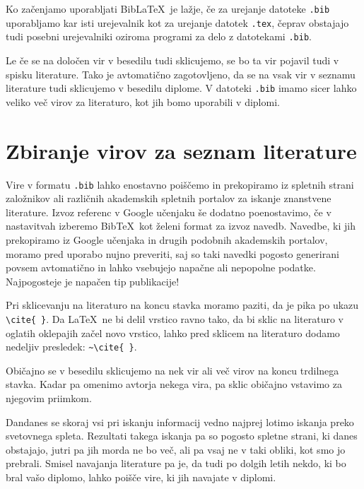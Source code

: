\documentclass[a4paper,12pt,openright]{book}
\newcommand{\BibLaTeX}{{\sc Bib}\LaTeX}
\newcommand{\BibTeX}{{\sc Bib}\TeX}
\begin{document}
    Ko začenjamo uporabljati \BibLaTeX\ je lažje, če za urejanje datoteke \texttt{.bib} uporabljamo kar isti urejevalnik kot za urejanje datotek \texttt{.tex},
    čeprav obstajajo tudi posebni urejevalniki oziroma programi za delo z datotekami \texttt{.bib}.

    Le če se na določen vir v besedilu tudi sklicujemo, se bo ta vir pojavil tudi v spisku literature.
    Tako je avtomatično zagotovljeno, da se na vsak vir v seznamu literature tudi sklicujemo v besedilu diplome.
    V datoteki \texttt{.bib} imamo sicer lahko veliko več virov za literaturo, kot jih bomo uporabili v diplomi.


    \section{Zbiranje virov za seznam literature}

    Vire v formatu \texttt{.bib}  lahko enostavno poiščemo in prekopiramo iz spletnih strani založnikov ali različnih akademskih spletnih portalov za iskanje znanstvene literature.
    Izvoz referenc v Google učenjaku še dodatno poenostavimo, če v nastavitvah izberemo \BibTeX\ kot želeni format za izvoz navedb.
    Navedbe, ki jih prekopiramo iz Google učenjaka in drugih podobnih akademskih portalov, moramo pred uporabo nujno preveriti, saj so taki navedki pogosto generirani povsem avtomatično in lahko vsebujejo napačne ali nepopolne podatke.
    Najpogosteje je napačen tip publikacije!

    Pri sklicevanju na literaturo na koncu stavka moramo paziti, da je pika po ukazu \verb=\cite{ }=.
    Da \LaTeX\ ne bi delil vrstico ravno tako, da bi sklic na literaturo v oglatih oklepajih začel novo vrstico, lahko pred sklicem na literaturo dodamo nedeljiv presledek: \verb=~\cite{ }=.

    Običajno se v besedilu sklicujemo na nek vir ali več virov na koncu trdilnega stavka.
    Kadar pa omenimo avtorja nekega vira, pa sklic običajno vstavimo za njegovim priimkom.


    Dandanes se skoraj vsi pri iskanju informacij vedno najprej lotimo iskanja preko svetovnega spleta.
    Rezultati takega iskanja pa so pogosto spletne strani, ki danes obstajajo, jutri pa jih morda ne bo več, ali pa vsaj ne v taki obliki, kot smo jo prebrali.
    Smisel navajanja literature pa je, da tudi po dolgih letih nekdo, ki bo bral vašo diplomo, lahko poišče vire, ki jih navajate v diplomi.
\end{document}

